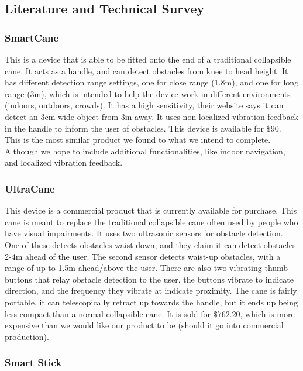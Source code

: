 \documentclass[letterpaper,12pt]{article}
\begin{document}
\subsection{Literature and Technical Survey}
\subsubsection {SmartCane}
This is a device that is able to be fitted onto the end of a traditional collapsible cane. It acts as a handle, and can detect obstacles from knee to head height. It has different detection range settings, one for close range (1.8m),  and one for long range (3m), which is intended to help the device work in different environments (indoors, outdoors, crowds). It has a high sensitivity, their website says it can detect an 3cm wide object from 3m away. It uses non-localized vibration feedback in the handle to inform the user of obstacles. This device is available for $ \$90$. This is the most similar product we found to what we intend to complete. Although we hope to include additional functionalities, like indoor navigation, and localized vibration feedback. \cite{SmartCane}

\subsubsection {UltraCane}

This device is a commercial product that is currently available for purchase. This cane is meant to replace the traditional collapsible cane often used by people who have visual impairments. It uses two ultrasonic sensors for obstacle detection. One of these detects obstacles waist-down, and they claim it can detect obstacles 2-4m ahead of the user. The second sensor detects waist-up obstacles, with a range of up to 1.5m ahead/above the user. There are also two vibrating thumb buttons that relay obstacle detection to the user, the buttons vibrate to indicate direction, and the frequency they vibrate at indicate proximity. The cane is fairly portable, it can telescopically retract up towards the handle, but it ends up being less compact than a normal collapsible cane. It is sold for $ \$762.20$, which is more expensive than we would like our product to be (should it go into commercial production). \cite{UltraCane}

\subsubsection {Smart Stick}
\end{document}
